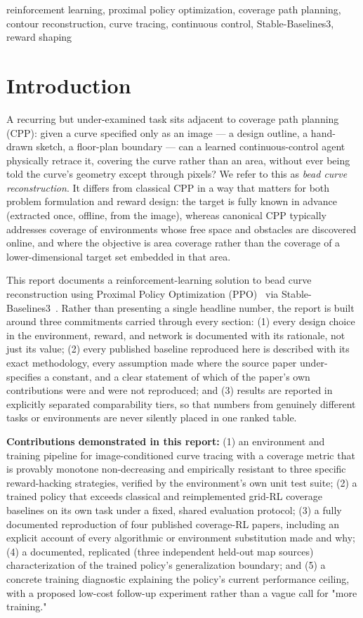 \documentclass[conference]{IEEEtran}
\begin{document}
\begin{IEEEkeywords}
reinforcement learning, proximal policy optimization, coverage path planning, contour reconstruction, curve tracing, continuous control, Stable-Baselines3, reward shaping
\end{IEEEkeywords}

\section{Introduction}

A recurring but under-examined task sits adjacent to coverage path planning (CPP): given a curve specified only as an image --- a design outline, a hand-drawn sketch, a floor-plan boundary --- can a learned continuous-control agent physically retrace it, covering the curve rather than an area, without ever being told the curve's geometry except through pixels? We refer to this as \emph{bead curve reconstruction}. It differs from classical CPP in a way that matters for both problem formulation and reward design: the target is fully known in advance (extracted once, offline, from the image), whereas canonical CPP typically addresses coverage of environments whose free space and obstacles are discovered online, and where the objective is area coverage rather than the coverage of a lower-dimensional target set embedded in that area.

This report documents a reinforcement-learning solution to bead curve reconstruction using Proximal Policy Optimization (PPO)~\cite{schulman2017ppo} via Stable-Baselines3~\cite{raffin2021sb3}. Rather than presenting a single headline number, the report is built around three commitments carried through every section: (1) every design choice in the environment, reward, and network is documented with its rationale, not just its value; (2) every published baseline reproduced here is described with its exact methodology, every assumption made where the source paper under-specifies a constant, and a clear statement of which of the paper's own contributions were and were not reproduced; and (3) results are reported in explicitly separated comparability tiers, so that numbers from genuinely different tasks or environments are never silently placed in one ranked table.

\textbf{Contributions demonstrated in this report:} (1) an environment and training pipeline for image-conditioned curve tracing with a coverage metric that is provably monotone non-decreasing and empirically resistant to three specific reward-hacking strategies, verified by the environment's own unit test suite; (2) a trained policy that exceeds classical and reimplemented grid-RL coverage baselines on its own task under a fixed, shared evaluation protocol; (3) a fully documented reproduction of four published coverage-RL papers, including an explicit account of every algorithmic or environment substitution made and why; (4) a documented, replicated (three independent held-out map sources) characterization of the trained policy's generalization boundary; and (5) a concrete training diagnostic explaining the policy's current performance ceiling, with a proposed low-cost follow-up experiment rather than a vague call for "more training."
\end{document}
